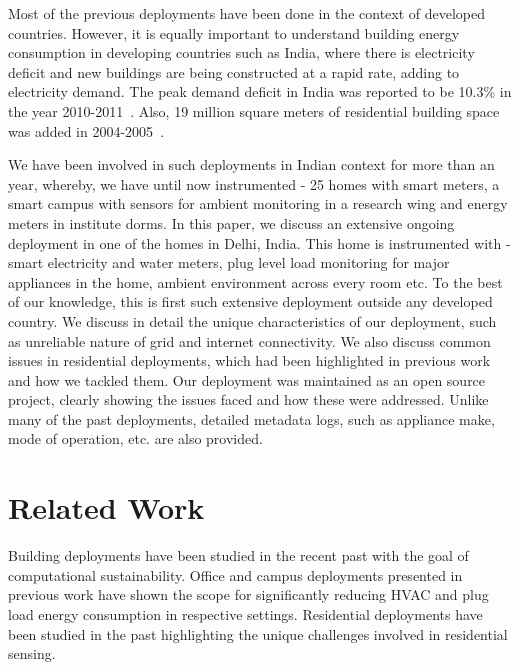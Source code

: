 \documentclass[10pt]{sensys-proc}
\begin{document}
 Most of the previous deployments have been done in the context of developed countries. However, it is equally important to understand building energy consumption in developing countries such as India, where there is electricity deficit and new buildings are being constructed at a rapid rate, adding to electricity demand. The peak demand deficit in India was reported to be 10.3\% in the year 2010-2011~\cite{india_energy_book}. Also, 19 million square meters of residential building space was added in 2004-2005~\cite{evans09india}.

We have been involved in such deployments in Indian context for more than an year, whereby, we have until now instrumented - 25 homes with smart meters, a smart campus with sensors for ambient monitoring in a research wing and energy meters in institute dorms.
In this paper, we discuss an extensive ongoing deployment in one of the homes in Delhi, India. This home is instrumented with - smart electricity and water meters, plug level load monitoring for major appliances in the home, ambient environment across every room etc. To the best of our knowledge, this is first such extensive deployment outside any developed country. We discuss in detail the unique characteristics of our deployment, such as unreliable nature of grid and internet connectivity. We also discuss common issues in residential deployments, which had been highlighted in previous work and how we tackled them. Our deployment was maintained as an open source project, clearly showing the issues faced and how these were addressed. Unlike many of the past deployments, detailed metadata logs, such as appliance make, mode of operation, etc. are also provided. 

\section{Related Work}
Building deployments have been studied in the recent past with the goal of computational sustainability. Office and campus deployments presented in previous work \cite{yuvraj_dashboard,yuvraj_ipsn,batra} have shown the scope for significantly reducing HVAC and plug load energy consumption in respective settings. Residential deployments have been studied in the past highlighting the unique challenges involved in residential sensing.
\end{document}
